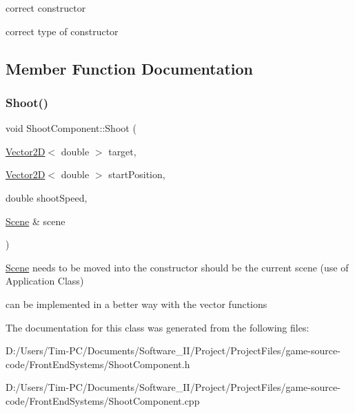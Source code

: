 correct constructor 

correct type of constructor 

\subsection{Member Function Documentation}
\mbox{\label{class_shoot_component_a27a553ba952e96c77bc6e7d2e5ca9f0a}} 
\subsubsection{\texorpdfstring{Shoot()}{Shoot()}}
{\footnotesize\ttfamily void Shoot\+Component\+::\+Shoot (\begin{DoxyParamCaption}\item[{\hyperlink{class_vector2_d}{Vector2D}$<$ double $>$}]{target,  }\item[{\hyperlink{class_vector2_d}{Vector2D}$<$ double $>$}]{start\+Position,  }\item[{double}]{shoot\+Speed,  }\item[{\hyperlink{class_scene}{Scene} \&}]{scene }\end{DoxyParamCaption})}



\hyperlink{class_scene}{Scene} needs to be moved into the constructor should be the current scene (use of Application Class) 

can be implemented in a better way with the vector functions 

The documentation for this class was generated from the following files\+:\begin{DoxyCompactItemize}
\item 
D\+:/\+Users/\+Tim-\/\+P\+C/\+Documents/\+Software\+\_\+\+I\+I/\+Project/\+Project\+Files/game-\/source-\/code/\+Front\+End\+Systems/Shoot\+Component.\+h\item 
D\+:/\+Users/\+Tim-\/\+P\+C/\+Documents/\+Software\+\_\+\+I\+I/\+Project/\+Project\+Files/game-\/source-\/code/\+Front\+End\+Systems/Shoot\+Component.\+cpp\end{DoxyCompactItemize}
